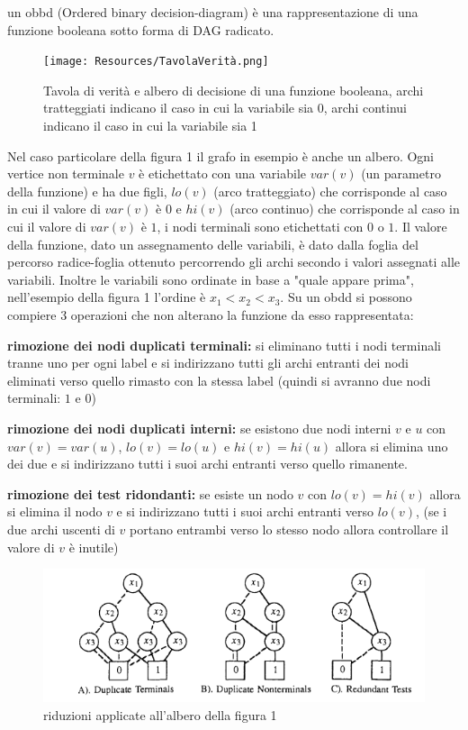 \documentclass{article}
\begin{document}
un obbd (Ordered binary decision-diagram) è una rappresentazione di una funzione booleana sotto forma di DAG radicato.

\begin{figure}[H]
    \centering
    \texttt{[image: Resources/TavolaVerità.png]}
    \caption{Tavola di verità e albero di decisione di una funzione booleana, archi tratteggiati indicano il caso in cui la variabile sia 0, archi continui indicano il caso in cui la variabile sia 1}
    \label{fig:tavolaVerita}
\end{figure}

Nel caso particolare della figura 1 il grafo in esempio è anche un albero.
Ogni vertice non terminale $v$ è etichettato con una variabile $var(v)$ (un parametro della funzione) e ha due figli, $lo(v)$ (arco tratteggiato) che corrisponde al caso in cui il valore di $var(v)$ è $0$ e $hi(v)$ (arco continuo) che corrisponde al caso in cui il valore di $var(v)$ è $1$, i nodi terminali sono etichettati con $0$ o $1$.
Il valore della funzione, dato un assegnamento delle variabili, è dato dalla foglia del percorso radice-foglia ottenuto percorrendo gli archi secondo i valori assegnati alle variabili.
Inoltre le variabili sono ordinate in base a "quale appare prima", nell'esempio della figura 1 l'ordine è $x_1<x_2<x_3$.
Su un obdd si possono compiere 3 operazioni che non alterano la funzione da esso rappresentata:

\textbf{rimozione dei nodi duplicati terminali:} si eliminano tutti i nodi terminali tranne uno per ogni label e si indirizzano tutti gli archi entranti dei nodi eliminati verso quello rimasto con la stessa label (quindi si avranno due nodi terminali: $1$ e $0$)

\textbf{rimozione dei nodi duplicati interni:} se esistono due nodi interni $v$ e $u$ con $var(v) = var(u)$, $lo(v) = lo(u)$ e $hi(v) = hi(u)$ allora si elimina uno dei due e si indirizzano tutti i suoi archi entranti verso quello rimanente.

\textbf{rimozione dei test ridondanti:} se esiste un nodo $v$ con $lo(v) = hi(v)$ allora si elimina il nodo $v$ e si indirizzano tutti i suoi archi entranti verso $lo(v)$, (se i due archi uscenti di $v$ portano entrambi verso lo stesso nodo allora controllare il valore di $v$ è inutile)

\begin{figure}[H]
    \centering
    \includegraphics[max width=\linewidth, max height=0.9\textheight, keepaspectratio]{Resources/figure2obdd.png}
    \caption{riduzioni applicate all'albero della figura 1}
    \label{fig:riduzioni}
\end{figure}
\end{document}
